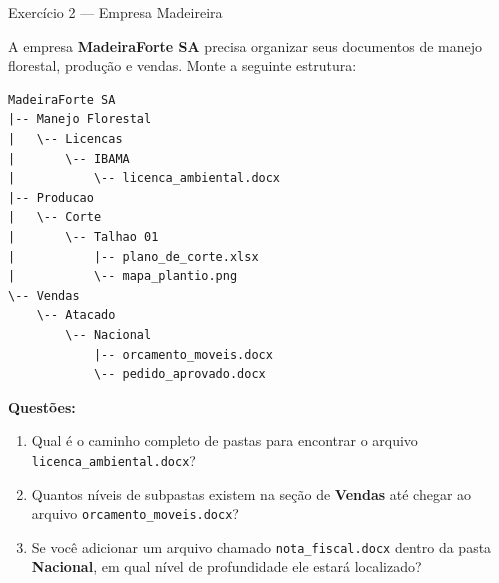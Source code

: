 \documentclass[12pt]{article}
\begin{document}
\vspace{0.4cm}

\begin{block}{Exercício 2 --- Empresa Madeireira}

A empresa \textbf{MadeiraForte SA} precisa organizar seus documentos de manejo florestal, produção e vendas. Monte a seguinte estrutura:

\begin{verbatim}
MadeiraForte SA
|-- Manejo Florestal
|   \-- Licencas
|       \-- IBAMA
|           \-- licenca_ambiental.docx
|-- Producao
|   \-- Corte
|       \-- Talhao 01
|           |-- plano_de_corte.xlsx
|           \-- mapa_plantio.png
\-- Vendas
    \-- Atacado
        \-- Nacional
            |-- orcamento_moveis.docx
            \-- pedido_aprovado.docx
\end{verbatim}

\textbf{Questões:}
\begin{enumerate}[label=\alph*)]
    \item Qual é o caminho completo de pastas para encontrar o arquivo \texttt{licenca\_ambiental.docx}?
    \item Quantos níveis de subpastas existem na seção de \textbf{Vendas} até chegar ao arquivo \texttt{orcamento\_moveis.docx}?
    \item Se você adicionar um arquivo chamado \texttt{nota\_fiscal.docx} dentro da pasta \textbf{Nacional}, em qual nível de profundidade ele estará localizado?
\end{enumerate}

\end{block}

\vspace{0.4cm}
\end{document}
